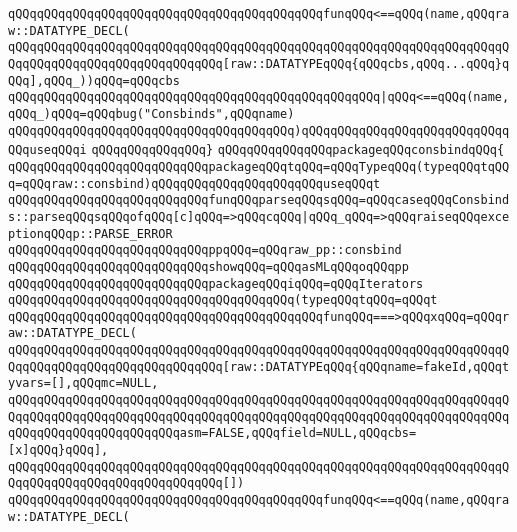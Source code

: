 \verb|qQQqqQQqqQQqqQQqqQQqqQQqqQQqqQQqqQQqqQQqqQQqfunqQQq<==qQQq(name,qQQqraw::DATATYPE_DECL(|\newline
\verb|qQQqqQQqqQQqqQQqqQQqqQQqqQQqqQQqqQQqqQQqqQQqqQQqqQQqqQQqqQQqqQQqqQQqqQQqqQQqqQQqqQQqqQQqqQQqqQQqqQQq[raw::DATATYPEqQQq{qQQqcbs,qQQq...qQQq}qQQq],qQQq_))qQQq=qQQqcbs|\newline
\verb|qQQqqQQqqQQqqQQqqQQqqQQqqQQqqQQqqQQqqQQqqQQqqQQqqQQq|\verb#|qQQq<==qQQq(name,qQQq_)qQQq=qQQqbug("Consbinds",qQQqname)#\newline
\verb|qQQqqQQqqQQqqQQqqQQqqQQqqQQqqQQqqQQqqQQq)qQQqqQQqqQQqqQQqqQQqqQQqqQQqqQQquseqQQqi|\newline
\verb|qQQqqQQqqQQqqQQq}|\newline
\newline
\verb|qQQqqQQqqQQqqQQqpackageqQQqconsbindqQQq{|\newline
\newline
\verb|qQQqqQQqqQQqqQQqqQQqqQQqqQQqpackageqQQqtqQQq=qQQqTypeqQQq(typeqQQqtqQQq=qQQqraw::consbind)qQQqqQQqqQQqqQQqqQQqqQQquseqQQqt|\newline
\verb|qQQqqQQqqQQqqQQqqQQqqQQqqQQqfunqQQqparseqQQqsqQQq=qQQqcaseqQQqConsbinds::parseqQQqsqQQqofqQQq[c]qQQq=>qQQqcqQQq|\verb#|qQQq_qQQq=>qQQqraiseqQQqexceptionqQQqp::PARSE_ERROR#\newline
\verb|qQQqqQQqqQQqqQQqqQQqqQQqqQQqppqQQq=qQQqraw_pp::consbind|\newline
\verb|qQQqqQQqqQQqqQQqqQQqqQQqqQQqshowqQQq=qQQqasMLqQQqoqQQqpp|\newline
\verb|qQQqqQQqqQQqqQQqqQQqqQQqqQQqpackageqQQqiqQQq=qQQqIterators|\newline
\verb|qQQqqQQqqQQqqQQqqQQqqQQqqQQqqQQqqQQqqQQq(typeqQQqtqQQq=qQQqt|\newline
\verb|qQQqqQQqqQQqqQQqqQQqqQQqqQQqqQQqqQQqqQQqqQQqfunqQQq===>qQQqxqQQq=qQQqraw::DATATYPE_DECL(|\newline
\verb|qQQqqQQqqQQqqQQqqQQqqQQqqQQqqQQqqQQqqQQqqQQqqQQqqQQqqQQqqQQqqQQqqQQqqQQqqQQqqQQqqQQqqQQqqQQqqQQqqQQq[raw::DATATYPEqQQq{qQQqname=fakeId,qQQqtyvars=[],qQQqmc=NULL,|\newline
\verb|qQQqqQQqqQQqqQQqqQQqqQQqqQQqqQQqqQQqqQQqqQQqqQQqqQQqqQQqqQQqqQQqqQQqqQQqqQQqqQQqqQQqqQQqqQQqqQQqqQQqqQQqqQQqqQQqqQQqqQQqqQQqqQQqqQQqqQQqqQQqqQQqqQQqqQQqqQQqqQQqqQQqasm=FALSE,qQQqfield=NULL,qQQqcbs=[x]qQQq}qQQq],|\newline
\verb|qQQqqQQqqQQqqQQqqQQqqQQqqQQqqQQqqQQqqQQqqQQqqQQqqQQqqQQqqQQqqQQqqQQqqQQqqQQqqQQqqQQqqQQqqQQqqQQqqQQq[])|\newline
\verb|qQQqqQQqqQQqqQQqqQQqqQQqqQQqqQQqqQQqqQQqqQQqfunqQQq<==qQQq(name,qQQqraw::DATATYPE_DECL(|\newline
